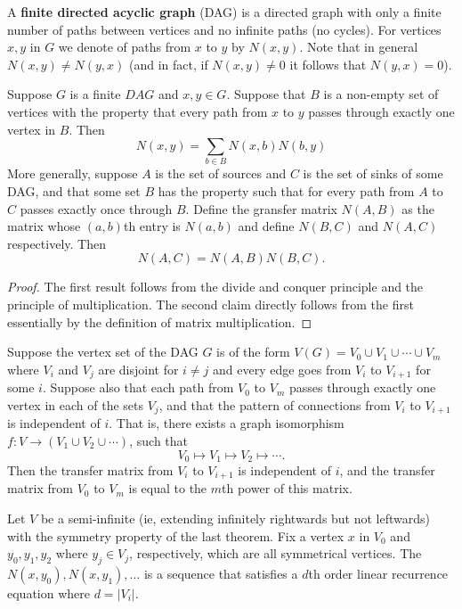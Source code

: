 \begin{definition}
A \textbf{finite directed acyclic graph} (DAG) is a directed graph with only a finite number of paths between vertices and no infinite paths (no cycles). For vertices $x, y$ in $G$ we denote of paths from $x$ to $y$ by $N(x, y)$. Note that in general $N(x, y) \neq N(y, x)$ (and in fact, if $N(x, y) \neq 0$ it follows that $N(y, x) = 0$).
\end{definition}

\begin{theorem}
Suppose $G$ is a finite $DAG$ and $x, y \in G$. Suppose that $B$ is a non-empty set of vertices with the property that every path from $x$ to $y$ passes through exactly one vertex in $B$. Then
\[N(x, y) = \sum_{b \in B}N(x, b)N(b, y)\]
More generally, suppose $A$ is the set of sources and $C$ is the set of sinks of some DAG, and that some set $B$ has the property such that for every path from $A$ to $C$ passes exactly once through $B$. Define the gransfer matrix $N(A, B)$ as the matrix whose $(a, b)$th entry is $N(a, b)$ and define $N(B, C)$ and $N(A, C)$ respectively. Then
\[N(A, C) = N(A, B)N(B, C).\]
\end{theorem}
\begin{proof}
The first result follows from the divide and conquer principle and the principle of multiplication. The second claim directly follows from the first essentially by the definition of matrix multiplication.
\end{proof}

\begin{theorem}
Suppose the vertex set of the DAG $G$ is of the form $V(G) = V_0 \cup V_1 \cup \cdots \cup V_m$ where $V_i$ and $V_j$ are disjoint for $i \neq j$ and every edge goes from $V_i$ to $V_{i + 1}$ for some $i$. Suppose also that each path from $V_0$ to $V_m$ passes through exactly one vertex in each of the sets $V_j$, and that the pattern of connections from $V_i$ to $V_{i + 1}$ is independent of $i$. That is, there exists a graph isomorphism $f: V \to (V_1 \cup V_2 \cup \cdots)$, such that 
\[V_0 \mapsto V_1 \mapsto V_2 \mapsto \cdots.\]
 Then the transfer matrix from $V_i$ to $V_{i + 1}$ is independent of $i$, and the transfer matrix from $V_0$ to $V_m$ is equal to the $m$th power of this matrix.
\end{theorem}

\begin{theorem}
Let $V$ be a semi-infinite (ie, extending infinitely rightwards but not leftwards) with the symmetry property of the last theorem. Fix a vertex $x$ in $V_0$ and $y_0, y_1, y_2$ where $y_j \in V_j$, respectively, which are all symmetrical vertices. The $N(x, y_0), N(x, y_1), \dots$ is a sequence that satisfies a $d$th order linear recurrence equation where $d = |V_i|$.
\end{theorem}

